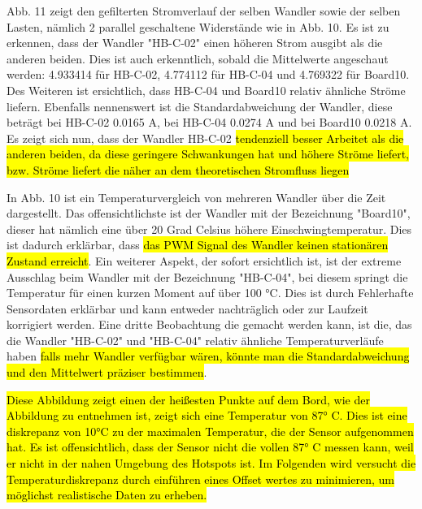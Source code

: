 \begin{flushleft}



Abb. 11 zeigt den gefilterten Stromverlauf der selben Wandler sowie der selben Lasten, nämlich 2 parallel geschaltene Widerstände wie in Abb. 10. Es ist zu erkennen, dass der Wandler "HB-C-02" einen höheren Strom ausgibt als die anderen beiden. Dies ist auch erkenntlich, sobald die Mittelwerte angeschaut werden: 4.933414 für HB-C-02, 4.774112 für HB-C-04 und 4.769322 für Board10. Des Weiteren ist ersichtlich, dass HB-C-04 und Board10 relativ ähnliche Ströme liefern. Ebenfalls nennenswert ist die Standardabweichung der Wandler, diese beträgt bei HB-C-02 0.0165 A, bei HB-C-04 0.0274 A und bei Board10 0.0218 A. Es zeigt sich nun, dass der Wandler HB-C-02 \hl{tendenziell besser Arbeitet als die anderen beiden, da diese geringere Schwankungen hat und höhere Ströme liefert, bzw. Ströme liefert die näher an dem theoretischen Stromfluss liegen}

In Abb. 10 ist ein Temperaturvergleich von mehreren Wandler über die Zeit dargestellt. Das offensichtlichste ist der Wandler mit der Bezeichnung "Board10", dieser hat nämlich eine über 20 Grad Celsius höhere Einschwingtemperatur. Dies ist dadurch erklärbar, dass \hl{das PWM Signal des Wandler keinen stationären Zustand erreicht}. Ein weiterer Aspekt, der sofort ersichtlich ist, ist der extreme Ausschlag beim Wandler mit der Bezeichnung "HB-C-04", bei diesem springt die Temperatur für einen kurzen Moment auf über 100 °C. Dies ist durch Fehlerhafte Sensordaten erklärbar und kann entweder nachträglich oder zur Laufzeit korrigiert werden. Eine dritte Beobachtung die gemacht werden kann, ist die, das die Wandler "HB-C-02" und "HB-C-04" relativ ähnliche Temperaturverläufe haben \hl{falls mehr Wandler verfügbar wären, könnte man die Standardabweichung und den Mittelwert präziser bestimmen}.

\hl{Diese Abbildung zeigt einen der heißesten Punkte auf dem Bord, wie der Abbildung zu entnehmen ist, zeigt sich eine Temperatur von 87° C. Dies ist eine diskrepanz von 10°C zu der maximalen Temperatur, die der Sensor aufgenommen hat. Es ist offensichtlich, dass der Sensor nicht die vollen 87° C messen kann, weil er nicht in der nahen Umgebung des Hotspots ist. Im Folgenden wird versucht die Temperaturdiskrepanz durch einführen eines Offset wertes zu minimieren, um möglichst realistische Daten zu erheben.}
\end{flushleft}